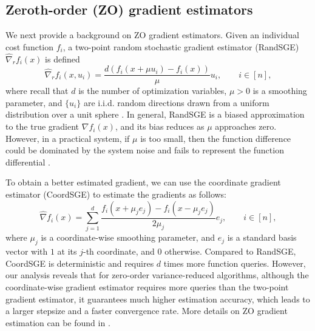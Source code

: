\documentclass{article}
\theoremstyle{definition}
\theoremstyle{remark}
\begin{document}
\subsection{Zeroth-order (ZO) gradient estimators}

{\color{Brown}
We
next provide a background on ZO gradient estimators.
Given an individual cost function $f_i$, a two-point random stochastic gradient estimator (RandSGE) $\hat{\nabla}_r f_i(x)$ is defined \cite{nesterov2017random,gao2018information}
\begin{equation}\label{gradestrand}
\hat{\nabla}_r f_i(x, u_i) = \frac{d(f_i(x+\mu u_i) - f_i(x))}{\mu}u_i,\qquad i\in [n],
\end{equation}
where recall that $d$ is the number of optimization variables, $\mu > 0$ is a smoothing parameter, and
$\{u_i\}$ are i.i.d. random directions drawn from a uniform distribution over a unit sphere \cite{flaxman2005online,shamir2017optimal,gao2018information}. In general, RandSGE is a biased approximation to the true gradient $\nabla f_i(x)$, and its bias reduces as $\mu$ approaches zero. However, in a practical system, if $\mu$ is too small, then the function difference
could be dominated by the system noise and fails to represent the function differential \cite{lian2016comprehensive}.}

{\color{Green}
To obtain a better estimated gradient, we
can use the coordinate gradient estimator
(CoordSGE) \cite{gu2018inexact,gu2018faster,liu2018zeroth} to estimate the gradients as follows:
\begin{equation}\label{gradestcoord}
\hat{\nabla} f_i(x) = \sum_{j=1}^d \frac{f_i(x+\mu_je_j) - f_i(x-\mu_je_j)}{2\mu_j}e_j,\qquad i\in [n],
\end{equation}
where $\mu_j$ is a coordinate-wise smoothing parameter, and $e_j$ is a standard basis vector with $1$ at its $j$-th coordinate,
and $0$ otherwise. 
}
{\color{Brown}
Compared to RandSGE, CoordSGE is deterministic and requires $d$ times more function queries. 
However, {\color{YellowOrange}
our analysis reveals that for zero-order variance-reduced
algorithms, although the coordinate-wise gradient estimator
requires more queries than the two-point gradient estimator,
it guarantees much higher estimation accuracy, which leads
to a larger stepsize and a faster convergence rate}. More details on ZO gradient estimation can be found in \cite{kazemi2018proximal}.
}
\end{document}
